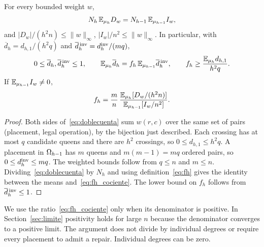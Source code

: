 \begin{lema}\label{lem:doblecuenta} For every bounded weight $w$,
\begin{equation}\label{eq:doblecuenta}
 N_h\,\mathbb{E}_{\mu_h}D_w=N_{h-1}\,\mathbb{E}_{\mu_{h-1}}I_w ,
\end{equation} and $|D_w|/(h^2n)\le\|w\|_\infty$, $|I_w|/n^2\le\|w\|_\infty$. In particular, with
$\overline d_h=d_{h,1}/(h^2q)$ and
$\overline d{}^{\,\mathrm{inv}}_h=d_h^{\mathrm{inv}}/(mq)$, \[
 0\le\overline d_h,\overline d{}^{\,\mathrm{inv}}_h\le1,\qquad
 \mathbb{E}_{\mu_h}\overline d_h=f_h\,\mathbb{E}_{\mu_{h-1}}\overline d{}^{\,\mathrm{inv}}_h,\qquad
 f_h\ge\frac{\mathbb{E}_{\mu_h}d_{h,1}}{h^2q}.
\] If $\mathbb{E}_{\mu_{h-1}}I_w\ne0$, \begin{equation}\label{eq:fh_cociente}
 f_h=\frac mn\,\frac{\mathbb{E}_{\mu_h}[D_w/(h^2n)]}{\mathbb{E}_{\mu_{h-1}}[I_w/n^2]} .
\end{equation} \end{lema}

\begin{proof} Both sides of~\eqref{eq:doblecuenta} sum $w(r,c)$ over the same set of pairs (placement, legal
operation), by the
bijection just described. Each crossing has at most $q$ candidate queens and there are $h^2$ crossings, so
$0\le d_{h,1}\le h^2q$. A
placement in $\Omega_{h-1}$ has $m$ queens and $m(m-1)=mq$ ordered pairs, so $0\le d_h^{\mathrm{inv}}\le mq$. The
weighted bounds follow from $q\le
n$ and $m\le
n$. Dividing~\eqref{eq:doblecuenta} by $N_h$ and using definition~\eqref{eq:fh} gives the identity between
the means
and~\eqref{eq:fh_cociente}. The lower bound on $f_h$ follows from $\overline d{}^{\,\mathrm{inv}}_h\le1$.
\end{proof}

We use the ratio~\eqref{eq:fh_cociente} only when its denominator is positive. In Section~\ref{sec:limite}
positivity holds for large
$n$ because the denominator converges to a positive limit. The argument does not divide by individual
degrees or require every
placement to admit a repair. Individual degrees can be zero.
